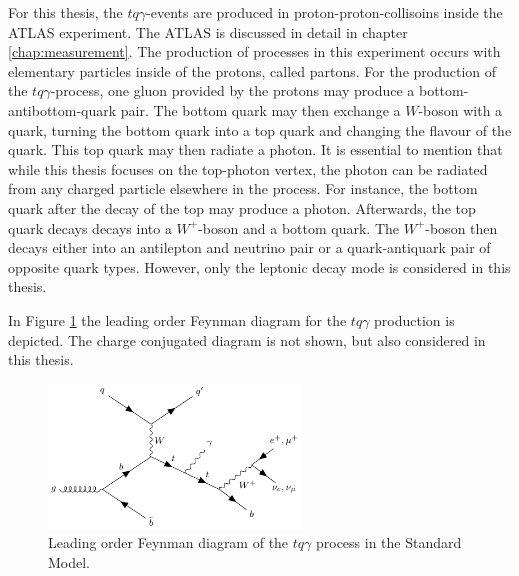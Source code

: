 For this thesis, the $tq\gamma$-events are produced in proton-proton-collisoins inside the ATLAS experiment. The ATLAS is discussed in detail in chapter \ref{chap:measurement}. The production of processes in this experiment occurs with elementary particles inside of the protons, called partons. For the production of the $tq\gamma$-process, one gluon provided by the protons may produce a bottom-antibottom-quark pair. The bottom quark may then exchange a $W$-boson with a quark, turning the bottom quark into a top quark and changing the flavour of the quark. This top quark may then radiate a photon. 
It is essential to mention that while this thesis focuses on the top-photon vertex, the photon can be radiated from any charged particle elsewhere in the process. For instance, the bottom quark after the decay of the top may produce a photon.
Afterwards, the top quark decays decays into a $W^+$-boson and a bottom quark. The $W^+$-boson then decays either into an antilepton and neutrino pair or a quark-antiquark pair of opposite quark types. However, only the leptonic decay mode is considered in this thesis.

In Figure \ref{fig:feyn_tqGamma} the leading order Feynman diagram for the $tq\gamma$ production is depicted. The charge conjugated diagram is not shown, but also considered in this thesis.
\begin{figure}
    \centering
    \includegraphics[width=0.6\textwidth]{Plots/s4_feyn_nom.pdf}
    \caption{Leading order Feynman diagram of the $tq\gamma$ process in the Standard Model.}
    \label{fig:feyn_tqGamma}
\end{figure}